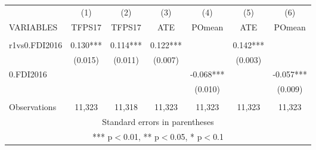 \documentclass[]{article}
\begin{document}
\begin{tabular}{lcccccc} \hline
 & (1) & (2) & (3) & (4) & (5) & (6) \\
VARIABLES & TFPS17 & TFPS17 & ATE & POmean & ATE & POmean \\ \hline
 &  &  &  &  &  &  \\
r1vs0.FDI2016 & 0.130*** & 0.114*** & 0.122*** &  & 0.142*** &  \\
 & (0.015) & (0.011) & (0.007) &  & (0.003) &  \\
0.FDI2016 &  &  &  & -0.068*** &  & -0.057*** \\
 &  &  &  & (0.010) &  & (0.009) \\
 &  &  &  &  &  &  \\
 Observations & 11,323 & 11,318 & 11,323 & 11,323 & 11,323 & 11,323 \\ \hline
\multicolumn{7}{c}{ Standard errors in parentheses} \\
\multicolumn{7}{c}{ *** p$<$0.01, ** p$<$0.05, * p$<$0.1} \\
\end{tabular}
\end{document}

